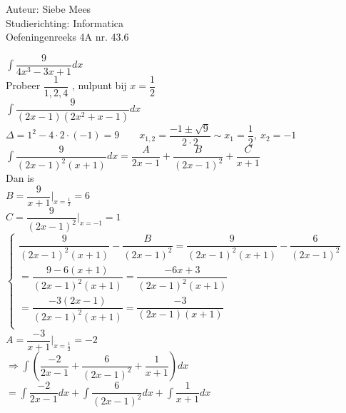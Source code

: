 \documentclass[a4paper]{article}
\begin{document}
  
\noindent \large Auteur: Siebe Mees \\
\noindent \large Studierichting: Informatica\\
\noindent \large Oefeningenreeks 4A nr. 43.6\\

\medskip

\normalsize

$ \displaystyle\int \dfrac{9}{4x^3-3x+1}dx $\\

Probeer $\dfrac{1}{1,2,4}$ , nulpunt bij $x = \dfrac{1}{2} $\\

$ \displaystyle\int \dfrac{9}{(2x-1)(2x^2+x-1)}dx $\\

$ \Delta =1^2-4\cdot 2\cdot (-1)=9 \qquad x_{1,2}=\dfrac{-1\pm \sqrt{9}}{2\cdot 2} \sim x_1=\dfrac{1}{2}, \ x_2=-1 $\\

$ \displaystyle\int \dfrac{9}{(2x-1)^2(x+1)}dx=\dfrac{A}{2x-1}+\dfrac{B}{(2x-1)^2}+\dfrac{C}{x+1} $\\

Dan is \\

$ B=\dfrac{9}{x+1}\bigg|_{x=\tfrac{1}{2}}=6 $\\

$ C=\dfrac{9}{(2x-1)^2}\bigg|_{x=-1}=1 $\\

$ \left \{
\begin{array}{l}
\dfrac{9}{(2x-1)^2(x+1)} - \dfrac{B}{(2x-1)^2} = \dfrac{9}{(2x-1)^2(x+1)} - \dfrac{6}{(2x-1)^2} \\

= \dfrac{9 - 6(x+1)}{(2x-1)^2(x+1)} = \dfrac{-6x + 3}{(2x-1)^2(x+1)} \\

= \dfrac{-3(2x-1)}{(2x-1)^2(x+1)} = \dfrac{-3}{(2x-1)(x+1)} \\

\end{array}
\right . $\\

$ A = \dfrac{-3}{x+1} \bigg|_{x = \tfrac{1}{2}} = -2 $\\

$ \Rightarrow \displaystyle\int \left( \dfrac{-2}{2x-1}+\dfrac{6}{(2x-1)^2}+\dfrac{1}{x+1} \right)dx $\\

$ =\displaystyle\int \dfrac{-2}{2x-1}dx+\displaystyle\int \dfrac{6}{(2x-1)^2}dx+\displaystyle\int \dfrac{1}{x+1}dx $\\
\end{document}
